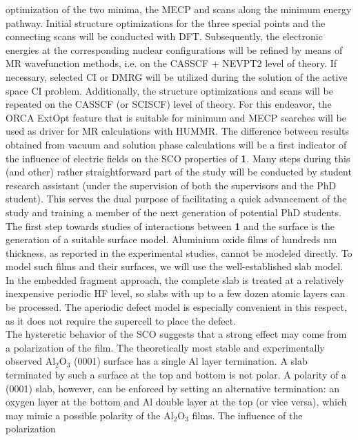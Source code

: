 \documentclass[a4paper,11pt,headings=normal]{scrartcl}
\begin{document}
optimization of the two minima, the MECP and scans along the minimum energy 
pathway. Initial  structure optimizations for the three special points and the 
connecting scans will be conducted with DFT. Subsequently, the electronic energies 
at the corresponding nuclear configurations will be refined by means of MR 
wavefunction methods, i.e. on the CASSCF + NEVPT2 level of theory. If necessary, 
selected CI or DMRG will be utilized during the solution of the active space CI 
problem. Additionally, the 
structure optimizations and scans will be repeated on the CASSCF (or SCISCF) 
level of theory. For this endeavor, the ORCA ExtOpt feature\autocite{Neese2020b} 
that is suitable for minimum and MECP searches will be used as driver for MR 
calculations with HUMMR. The difference between results obtained from vacuum and 
solution phase calculations will be a first indicator of the influence of 
electric fields on the SCO properties of \textbf{1}.
Many steps during this (and other) rather straightforward part of the study will 
be conducted by student research assistant (under the supervision of both the 
supervisors and the PhD student). This serves the dual purpose of facilitating a 
quick advancement of the study and training a member of the next generation of 
potential PhD students.\\
The first step towards studies of interactions between \textbf{1} and the 
surface is the generation of a suitable surface model. Aluminium oxide films of 
hundreds nm thickness, as reported in the experimental studies, cannot be modeled 
directly. To model such films and their surfaces, we will use the 
well-established slab model. In the embedded fragment approach, the complete 
slab is treated at a relatively inexpensive periodic HF level, so slabs with up 
to a few dozen atomic layers can be processed. The 
aperiodic defect model is especially convenient in this respect, as it does not 
require the supercell to place the defect.\\
The hysteretic behavior of the SCO suggests that a strong effect may come from 
a polarization of the film. The theoretically most stable and 
experimentally observed Al$_2$O$_3$ (0001) surface has a single Al layer 
termination.\autocite{Kurita2010} A slab terminated by such a surface at 
the top and bottom is not polar. A polarity of a (0001) slab, however, 
can be enforced by setting an alternative termination: an oxygen layer at the 
bottom and Al double layer at the top (or vice versa), which may mimic a 
possible polarity of the Al$_2$O$_3$ films. The influence of the polarization 
\end{document}
